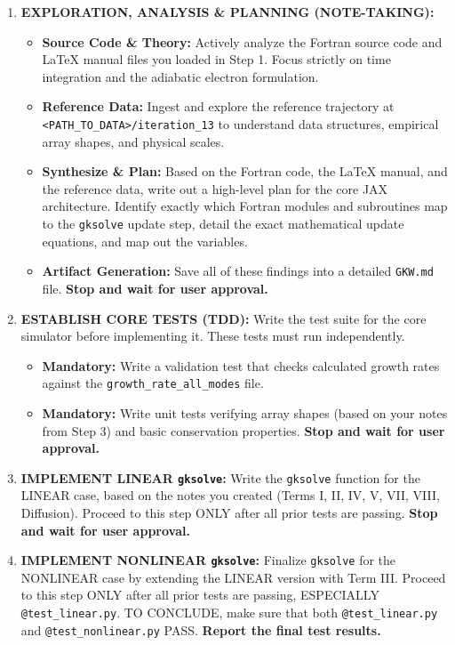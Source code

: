 \documentclass{article}
\theoremstyle{plain}
\theoremstyle{definition}
\theoremstyle{remark}
\begin{document}
\begin{promptbox}[]
\begin{enumerate}[leftmargin=*, noitemsep, topsep=0pt]
    \item \textbf{EXPLORATION, ANALYSIS \& PLANNING (NOTE-TAKING):}
    \begin{itemize}[leftmargin=*, noitemsep, topsep=0pt]
        \item \textbf{Source Code \& Theory:} Actively analyze the Fortran source code and LaTeX manual files you loaded in Step 1. Focus strictly on time integration and the adiabatic electron formulation.
        \item \textbf{Reference Data:} Ingest and explore the reference trajectory at \texttt{<PATH\_TO\_DATA>/iteration\_13} to understand data structures, empirical array shapes, and physical scales.
        \item \textbf{Synthesize \& Plan:} Based on the Fortran code, the LaTeX manual, and the reference data, write out a high-level plan for the core JAX architecture. Identify exactly which Fortran modules and subroutines map to the \texttt{gksolve} update step, detail the exact mathematical update equations, and map out the variables.
        \item \textbf{Artifact Generation:} Save all of these findings into a detailed \texttt{GKW.md} file. \textbf{Stop and wait for user approval.}
    \end{itemize}
    
    \item \textbf{ESTABLISH CORE TESTS (TDD):} Write the test suite for the core simulator before implementing it. These tests must run independently.
    \begin{itemize}[leftmargin=*, noitemsep, topsep=0pt]
        \item \textbf{Mandatory:} Write a validation test that checks calculated growth rates against the \texttt{growth\_rate\_all\_modes} file.
        \item \textbf{Mandatory:} Write unit tests verifying array shapes (based on your notes from Step 3) and basic conservation properties. \textbf{Stop and wait for user approval.}
    \end{itemize}
    
    \item \textbf{IMPLEMENT LINEAR \texttt{gksolve}:} Write the \texttt{gksolve} function for the LINEAR case, based on the notes you created (Terms I, II, IV, V, VII, VIII, Diffusion). Proceed to this step ONLY after all prior tests are passing. \textbf{Stop and wait for user approval.}
    
    \item \textbf{IMPLEMENT NONLINEAR \texttt{gksolve}:} Finalize \texttt{gksolve} for the NONLINEAR case by extending the LINEAR version with Term III. Proceed to this step ONLY after all prior tests are passing, ESPECIALLY \texttt{@test\_linear.py}. TO CONCLUDE, make sure that both \texttt{@test\_linear.py} and \texttt{@test\_nonlinear.py} PASS. \textbf{Report the final test results.}
\end{enumerate}
\end{promptbox}
\end{document}
